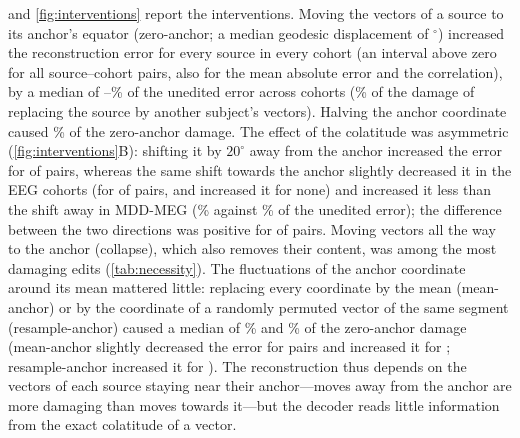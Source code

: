 \documentclass[10pt,letterpaper]{article}
\begin{document}
 and \cref{fig:interventions} report the interventions. Moving the vectors
of a source to its anchor's equator (zero-anchor; a median geodesic displacement of
\MatchedDisp$^\circ$) increased the reconstruction error for every source in every cohort
(an interval above zero for all \SourceCohortPairs{} source--cohort pairs, also for the mean absolute
error and the correlation\GuardZeroAnchorAll), by a median of \ZeroAnchorRelMin--\ZeroAnchorRelMax\%
of the unedited error across cohorts (\ZeroOverSourceMedianPct\% of the damage of replacing the source
by another subject's vectors). Halving the anchor coordinate caused \HalfOverZeroMedianPct\%
of the zero-anchor damage. The effect of the colatitude was asymmetric (\cref{fig:interventions}B): shifting
it by $20^\circ$ away from the anchor increased the error for \ColatPTwentyPositiveCount{} of
\SourceCohortPairs{} pairs, whereas the same shift towards the anchor slightly decreased it in the
EEG cohorts (for \ColatMTwentyNegativeCountEEG{} of \EEGSourceCohortPairs{} pairs, and increased it
for none\GuardColatNone) and increased it less than the shift away in MDD-MEG
(\ColatMTwentyRelMEG\% against \ColatPTwentyRelMEG\% of the unedited error); the difference
between the two directions was positive for \ColatAsymCount{} of \SourceCohortPairs{} pairs. Moving
vectors all the way to the anchor (collapse), which also removes their content, was among the
most damaging edits (\cref{tab:necessity}). The fluctuations of the anchor coordinate around its
mean mattered little: replacing every coordinate by the mean (mean-anchor) or by the
coordinate of a randomly permuted vector of the same segment (resample-anchor) caused a median of
\MeanOverZeroMedianPct\% and \ResampleOverZeroMedianPct\% of the zero-anchor damage
(mean-anchor slightly decreased the error for \MeanAnchorNegativeCount{} pairs and increased it
for \MeanAnchorPositiveCount; resample-anchor increased it for \ResampleAnchorPositiveCount).
The reconstruction thus depends on the vectors of each source staying near their anchor---moves
away from the anchor are more damaging than moves towards it---but the decoder reads little
information from the exact colatitude of a vector.


\end{document}
